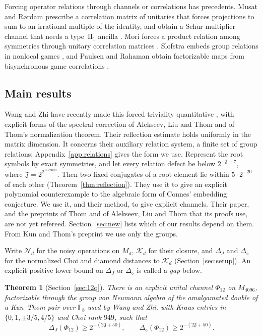 \documentclass[11pt]{article}
\newtheorem{headline}{Theorem}
\newcommand{\K}{\mathcal K}
\newcommand{\N}{\mathcal N}
\newcommand{\cJ}{\mathfrak J}
\begin{document}
Forcing operator relations through channels or correlations has precedents.  Musat and R\o rdam prescribe a correlation matrix of unitaries that forces projections to sum to an irrational multiple of the identity, and obtain a Schur-multiplier channel that needs a type~$\mathrm{II}_1$ ancilla \cite[Theorem~4.1]{MusatRordam20}.  Mori forces a product relation among symmetries through unitary correlation matrices \cite{Mori24}.  Slofstra embeds group relations in nonlocal games \cite{Slofstra20}, and Paulsen and Rahaman obtain factorizable maps from bisynchronous game correlations \cite{PaulsenRahaman21}.

\subsection{Main results}
Wang and Zhi have recently made this forced triviality quantitative \cite{WangZhi26}, with explicit forms of the spectral correction of Alekseev, Liu and Thom and of Thom's normalization theorem.  Their reflection estimate holds uniformly in the matrix dimension.  It concerns their auxiliary relation system, a finite set of group relations; Appendix~\ref{app:relations} gives the form we use.  Represent the root symbols by exact symmetries, and let every relation defect be below $2^{-\cJ-7}$, where $\cJ=2^{2^{1122000}}$.  Then two fixed conjugates of a root element lie within $5\cdot2^{-20}$ of each other \cite[Theorem~5.2]{WangZhi26} (Theorem~\ref{thm:reflection}).  They use it to give an explicit polynomial counterexample to the algebraic form of Connes' embedding conjecture.  We use it, and their method, to give explicit channels.  Their paper, and the preprints of Thom and of Alekseev, Liu and Thom that its proofs use, are not yet refereed.  Section~\ref{sec:new} lists which of our results depend on them.  From Kun and Thom's preprint we use only the groups.

Write $\N_d$ for the noisy operations on $M_d$, $\K_d$ for their closure, and $\Delta_J$ and $\Delta_\diamond$ for the normalized Choi and diamond distances to $\K_d$ (Section~\ref{sec:setup}).  An explicit positive lower bound on $\Delta_J$ or $\Delta_\diamond$ is called a \emph{gap} below.

\begin{headline}[Section~\ref{sec:12q}]\label{hl:12q}
There is an explicit unital channel $\Phi_{12}$ on $M_{4096}$, factorizable through the group von Neumann algebra of the amalgamated double of a Kun--Thom pair over $\mathbb F_8$ used by Wang and Zhi, with Kraus entries in $\{0,1,\pm3/5,4/5\}$ and Choi rank $949$, such that
\[
 \Delta_J(\Phi_{12})\ge2^{-(2\cJ+50)},\qquad\Delta_\diamond(\Phi_{12})\ge2^{-(2\cJ+50)}.
\]
\end{headline}
\end{document}
